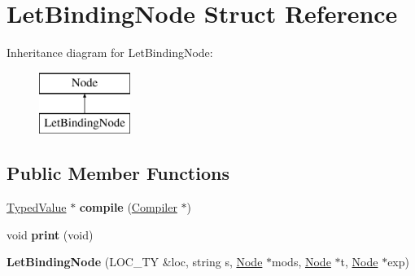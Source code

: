 \hypertarget{structLetBindingNode}{}\section{Let\+Binding\+Node Struct Reference}
\label{structLetBindingNode}
Inheritance diagram for Let\+Binding\+Node\+:\begin{figure}[H]
\begin{center}
\leavevmode
\includegraphics[height=2.000000cm]{structLetBindingNode}
\end{center}
\end{figure}
\subsection*{Public Member Functions}
\begin{DoxyCompactItemize}
\item 
\mbox{\label{structLetBindingNode_a0fda28a3bab7290361575b0edf9911c1}} 
\hyperlink{structTypedValue}{Typed\+Value} $\ast$ {\bfseries compile} (\hyperlink{structante_1_1Compiler}{Compiler} $\ast$)
\item 
\mbox{\label{structLetBindingNode_acfc058120ab9d962c8ceaf6bcd274c4f}} 
void {\bfseries print} (void)
\item 
\mbox{\label{structLetBindingNode_a361226d2c80ea5418146c1303d5c5517}} 
{\bfseries Let\+Binding\+Node} (L\+O\+C\+\_\+\+TY \&loc, string s, \hyperlink{structNode}{Node} $\ast$mods, \hyperlink{structNode}{Node} $\ast$t, \hyperlink{structNode}{Node} $\ast$exp)
\end{DoxyCompactItemize}
